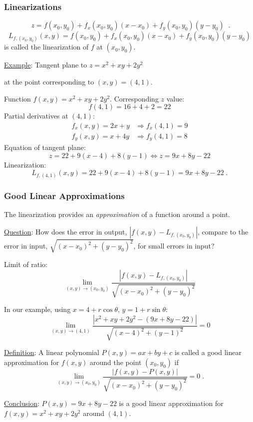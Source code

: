 \begin{frame}
  \frametitle{Linearizations}
$$\boxed{ \; z= f(x_0,y_0) + f_x(x_0,y_0) (x-x_0) + f_y(x_0,y_0)(y-y_0) \; }\; .$$
%
$$L_{f,(x_0,y_0)} (x,y) = f(x_0,y_0) + f_x(x_0,y_0) (x-x_0) + f_y(x_0,y_0)(y-y_0)$$
%
is called the \textcolor[rgb]{0.98,0.00,0.00}{linearization} of $f$ at $(x_0,y_0)$.

\pause
\underline{Example}: Tangent plane to $z=x^2+xy+2y^2$

at the point corresponding to $(x,y) = (4,1)$.

Function $f(x,y) = x^2+xy+2y^2$. \pause Corresponding $z$ value:
%
$$f(4,1) = 16+4+2 = 22$$
%
\pause Partial derivatives \textcolor[rgb]{0.98,0.00,0.00}{at $(4,1)$}:
%
\begin{align*}
  f_x(x,y) = 2x+y & \Longrightarrow f_x(4,1) = 9 \\
  f_y(x,y) = x+4y & \Longrightarrow f_y(4,1) = 8
\end{align*}
%
\pause Equation of tangent plane:
%
$$z = 22+ 9(x-4) + 8 (y-1) \Longleftrightarrow z = 9x+8y -22$$
%
\pause Linearization:
%
$$L_{f, (4,1)}(x,y) = 22+ 9(x-4) + 8 (y-1) = 9x+8y -22\; .$$
%
\end{frame}

\begin{frame}
  \frametitle{Good Linear Approximations}

The linearization provides an \emph{approximation} of a function around a point.

\underline{Question}: How does the error in output, $|f(x,y) - L_{f,(x_0,y_0)}|$, compare to the error in input, $\sqrt{(x-x_0)^2 + (y-y_0)^2}$, for small errors in input?

\pause Limit of ratio:
%
$$\lim_{(x,y) \to (x_0,y_0)} \frac{|f(x,y) - L_{f,(x_0,y_0)}|}{\sqrt{(x-x_0)^2 + (y-y_0)^2}}$$

\pause In our example, using $x=4+r\cos{\theta}$, $y=1+r\sin{\theta}$:
%
$$\lim_{(x,y) \to (4,1)} \frac{|x^2+xy+2y^2 - (9x+8y -22)|}{\sqrt{(x-4)^2+(y-1)^2}} = 0$$
%

\pause \underline{Definition}: A linear polynomial $P(x,y) = ax+by+c$ is called a \textcolor[rgb]{0.98,0.00,0.00}{good linear approximation} for $f(x,y)$ around the point $(x_0,y_0)$ if
%
$$\lim_{(x,y) \to (x_0,y_0)} \frac{|f(x,y) - P(x,y)|}{\sqrt{(x-x_0)^2 + (y-y_0)^2}} = 0\; .$$

\pause \underline{Conclusion}: $P(x,y) = 9x+8y-22$ is a good linear approximation for $f(x,y) = x^2+xy+2y^2$ around $(4,1)$.
\end{frame}
